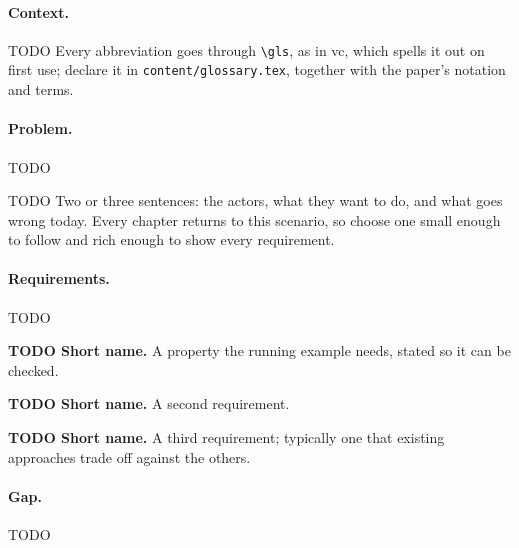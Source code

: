 \paragraph{Context.}\label{par:context}
TODO Every abbreviation goes through \texttt{\textbackslash gls}, as in \gls{vc}, which spells it out on first use; declare it in \texttt{content/glossary.tex}, together with the paper's notation and terms.

\paragraph{Problem.}\label{par:problem}
TODO
\begin{runningexample}
TODO Two or three sentences: the actors, what they want to do, and what goes wrong today. Every chapter returns to this scenario, so choose one small enough to follow and rich enough to show every requirement.
\end{runningexample}

\paragraph{Requirements.}
TODO
\begin{requirements}
  \item\label{req:first} \textbf{TODO Short name.} A property the running example needs, stated so it can be checked.
  \item\label{req:second} \textbf{TODO Short name.} A second requirement.
  \item\label{req:third} \textbf{TODO Short name.} A third requirement; typically one that existing approaches trade off against the others.
\end{requirements}

\paragraph{Gap.}\label{par:gap}
TODO

